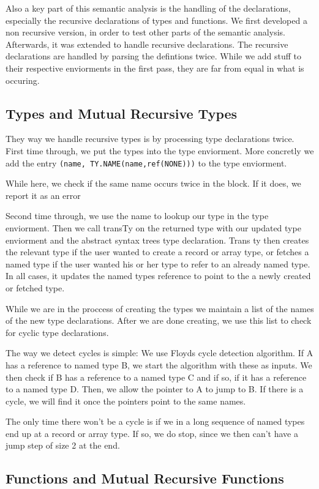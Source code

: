 \documentclass{article}
\begin{document}
Also a key part of this semantic analysis is the handling of the declarations, especially the recursive declarations of types and functions. We first developed a non recursive version, in order to test other parts of the semantic analysis. Afterwards, it was extended to handle recursive declarations. The recursive declarations are handled by parsing the defintions twice. While we add stuff to their respective enviorments in the first pass, they are far from equal in what is occuring.

\subsection{Types and Mutual Recursive Types}
They way we handle recursive types is by processing type declarations twice. 
First time through, we put the types into the type enviorment. More concretly
we add the entry \texttt{(name, TY.NAME(name,ref(NONE)))} to the type enviorment.

While here, we check if the same name occurs twice in the block. If it does, we report it as an error

Second time through, we use the name to lookup our type in the type enviorment.
Then we call transTy on the returned type with our updated type enviorment and the abstract syntax trees type declaration.
Trans ty then creates the relevant type if the user wanted to create a record or array type, or fetches a named type if the user wanted his or her type
to refer to an already named type. In all cases, it updates the named types reference to point to the a newly created or fetched type.

While we are in the proccess of creating the types we maintain a list of the names of the new type declarations. After
we are done creating, we use this list to check for cyclic type declarations.

The way we detect cycles is simple: We use Floyds cycle detection algorithm. If A has a reference to named type B, we start the algorithm
with these as inputs. We then check if B has a reference to a named type C and if so, if it has a reference to a named type D. 
Then, we allow the pointer to A to jump to B. If there is a cycle, we will find it once the pointers point to the same names.


The only time there won't be a cycle is if we in a long sequence of named types end up at a record or array type. If so, we do stop, since we then can't have a jump
step of size 2 at the end.

\subsection{Functions and Mutual Recursive Functions}
\end{document}
